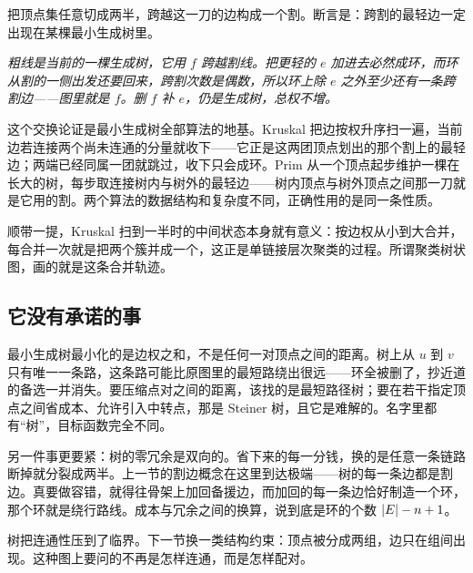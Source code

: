 把顶点集任意切成两半，跨越这一刀的边构成一个割。断言是：跨割的最轻边一定出现在某棵最小生成树里。

\begin{center}

\emph{粗线是当前的一棵生成树，它用 \(f\) 跨越割线。把更轻的 \(e\) 加进去必然成环，而环从割的一侧出发还要回来，跨割次数是偶数，所以环上除 \(e\) 之外至少还有一条跨割边——图里就是 \(f\)。删 \(f\) 补 \(e\)，仍是生成树，总权不增。}
\end{center}

这个交换论证是最小生成树全部算法的地基。Kruskal 把边按权升序扫一遍，当前边若连接两个尚未连通的分量就收下——它正是这两团顶点划出的那个割上的最轻边；两端已经同属一团就跳过，收下只会成环。Prim 从一个顶点起步维护一棵在长大的树，每步取连接树内与树外的最轻边——树内顶点与树外顶点之间那一刀就是它用的割。两个算法的数据结构和复杂度不同，正确性用的是同一条性质。

顺带一提，Kruskal 扫到一半时的中间状态本身就有意义：按边权从小到大合并，每合并一次就是把两个簇并成一个，这正是单链接层次聚类的过程。所谓聚类树状图，画的就是这条合并轨迹。

\subsection{它没有承诺的事}

最小生成树最小化的是边权之和，不是任何一对顶点之间的距离。树上从 \(u\) 到 \(v\) 只有唯一一条路，这条路可能比原图里的最短路绕出很远——环全被删了，抄近道的备选一并消失。要压缩点对之间的距离，该找的是最短路径树；要在若干指定顶点之间省成本、允许引入中转点，那是 Steiner 树，且它是难解的。名字里都有``树''，目标函数完全不同。

另一件事更要紧：树的零冗余是双向的。省下来的每一分钱，换的是任意一条链路断掉就分裂成两半。上一节的割边概念在这里到达极端——树的每一条边都是割边。真要做容错，就得往骨架上加回备援边，而加回的每一条边恰好制造一个环，那个环就是绕行路线。成本与冗余之间的换算，说到底是环的个数 \(\left|E\right|-n+1\)。

树把连通性压到了临界。下一节换一类结构约束：顶点被分成两组，边只在组间出现。这种图上要问的不再是怎样连通，而是怎样配对。
